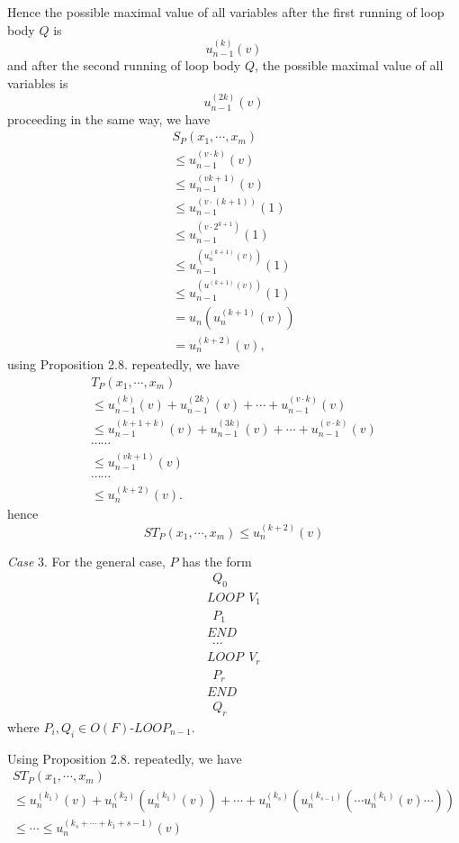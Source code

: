 Hence the possible maximal value of all variables after the first 
running of loop body $Q$ is
$$u^{(k)}_{n-1}(v)$$
and after the second running of loop body $Q$, the possible 
maximal value of all variables is
$$u^{(2k)}_{n-1}(v)$$
proceeding in the same way, we have
$$\begin{array}{l}  
S_P(x_1,\cdots,x_m)\\
\le u^{(v\cdot k)}_{n-1}(v)\\
\le u^{(vk+1)}_{n-1}(v)\\
\le u^{(v\cdot(k+1))}_{n-1}(1)\\
\le u^{(v\cdot 2^{k+1})}_{n-1}(1)\\
\le u^{(u^{(k+1)}_n(v))}_{n-1}(1)\\
\le u^{(u^{(k+1)}(v))}_{n-1}(1)\\
=u_n(u^{(k+1)}_n(v))\\
=u^{(k+2)}_n(v),\end{array}$$
using Proposition 2.8. repeatedly, we have
$$\begin{array}{l}  
T_P(x_1,\cdots,x_m)\\
\le u^{(k)}_{n-1}(v)+u^{(2k)}_{n-1}(v)+\cdots+u^{(v\cdot k)}_{n-
1}(v)\\
\le u^{(k+1+k)}_{n-1}(v)+u^{(3k)}_{n-1}(v)+\cdots+u^{(v\cdot 
k)}_{n-1}(v)\\
\cdots\cdots\\
\le u^{(vk+1)}_{n-1}(v)\\
\cdots\cdots\\
\le u^{(k+2)}_n(v).\end{array}$$
hence
$$ST_P(x_1,\cdots,x_m)\le u^{(k+2)}_n(v)$$

{\it Case} 3. For the general case, $P$ has the form
$$\begin{array}{l} 
\ \ Q_0\\
LOOP\ \ V_1\\
\ \ P_1\\
END\\
\ \ \cdots\\
LOOP\ \ V_r\\
\ \ P_r\\
END\\
\ \ Q_r\end{array}$$
where $P_i,Q_i\in O(F)$-$LOOP_{n-1}$.


Using Proposition 2.8. repeatedly, we have
$$\begin{array}{l}  
ST_P(x_1,\cdots,x_m)\\
\le 
u^{(k_1)}_n(v)+u^{(k_2)}_n(u^{(k_1)}_n(v))+\cdots+u^{(k_s)}_n(u^{(k_{s-1})}_n
(\cdots u^{(k_1)}_n(v)\cdots))\\
\le\cdots\le u^{(k_s+\cdots+k_1+s-1)}_n(v)\end{array}$$

